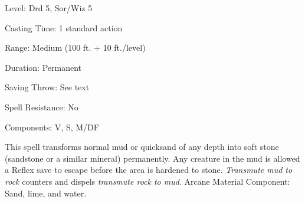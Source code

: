 
\begin{description*}
\item[Level:] Drd 5, Sor/Wiz 5
\item[Casting Time:] 1 standard action
\item[Range:] Medium (100 ft. + 10 ft./level)
\item[Duration:] Permanent
\item[Saving Throw:] See text
\item[Spell Resistance:] No
\item[Components:] V, S, M/DF
\end{description*}

This spell transforms normal mud or quicksand of any depth into soft stone (sandstone
or a similar mineral) permanently.
Any creature in the mud is allowed a Reflex save to escape before the area is hardened
to stone.
\textit{Transmute mud to rock} counters and dispels \textit{transmute rock to mud}.
Arcane Material Component: Sand, lime, and water.